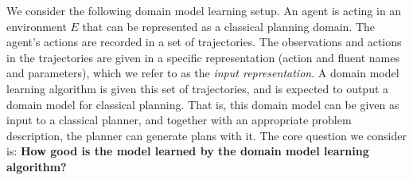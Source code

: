 \documentclass[letterpaper]{article} %
\newcommand{\realm}{{\ensuremath{M^*}}\xspace}
\newif\ifaddcomments
\newcommand{\roni}[1]{\ifaddcomments{\textcolor{red}{[Roni: #1]}}\fi}
\newcommand{\mauro}[1]{\ifaddcomments{\textcolor{green}{[Mauro: #1]}}\fi}
\newcommand{\gregor}[1]{\ifaddcomments{\textcolor{orange}{[Gregor: #1]}}\fi}
\begin{document}
We consider the following domain model learning setup. 
An agent is acting in an environment $E$ that can be represented as a classical planning domain. 
The agent's actions are recorded in a set of trajectories. %
The observations and actions in the trajectories are given in a specific representation (action and fluent names and parameters), which we refer to as the \emph{input representation}. 
A domain model learning algorithm is given this set of trajectories, and is expected to output a domain model for classical planning. 
That is, this domain model can be given as input to a classical planner, and together with an appropriate problem description, the planner can generate plans with it.
The core question we consider is: \textbf{How good is the model learned by the domain model learning algorithm?}








\end{document}
